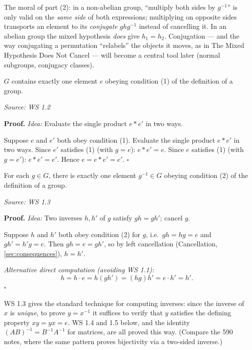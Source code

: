 \documentclass[11pt]{report}
\renewenvironment{proof}[1][Proof]{\noindent\textbf{#1.} }{\hfill$\square$\par\vspace{5pt}}
\newcommand{\srcline}[1]{\par\hfill{\footnotesize\textit{Source: #1}}}
\begin{document}
\begin{rembox}\label{rem:left-vs-right-conjugation}
The moral of part (2): in a non-abelian group, ``multiply both sides by $g^{-1}$'' is only valid on the \emph{same side} of both expressions; multiplying on opposite sides transports an element to its \emph{conjugate} $g h g^{-1}$ instead of cancelling it. In an abelian group the mixed hypothesis \emph{does} give $h_1 = h_2$. Conjugation --- and the way conjugating a permutation ``relabels'' the objects it moves, as in The Mixed Hypothesis Does Not Cancel --- will become a central tool later (normal subgroups, conjugacy classes).
\end{rembox}

\begin{propbox}\label{prop:uniqueness-identity}
$G$ contains exactly one element $e$ obeying condition (1) of the definition of a group.
\srcline{WS 1.2}
\end{propbox}

\begin{proof}
\textit{Idea:} Evaluate the single product $e \ast e'$ in two ways.\par
Suppose $e$ and $e'$ both obey condition (1). Evaluate the single product $e * e'$ in two ways. Since $e'$ satisfies (1) (with $g = e$): $e * e' = e$. Since $e$ satisfies (1) (with $g = e'$): $e * e' = e'$. Hence $e = e * e' = e'$.
\end{proof}

\begin{propbox}\label{prop:uniqueness-inverses}
For each $g \in G$, there is exactly one element $g^{-1} \in G$ obeying condition (2) of the definition of a group.
\srcline{WS 1.3}
\end{propbox}

\begin{proof}
\textit{Idea:} Two inverses $h, h'$ of $g$ satisfy $gh = gh'$; cancel $g$.\par
Suppose $h$ and $h'$ both obey condition (2) for $g$, i.e.\ $g h = h g = e$ and $g h' = h' g = e$. Then $g h = e = g h'$, so by left cancellation (Cancellation, \ref{sec:consequences}), $h = h'$.

\textit{Alternative direct computation (avoiding WS 1.1):}
\[ h = h \cdot e = h (g h') = (h g) h' = e \cdot h' = h'. \]
\end{proof}

\begin{rembox}\label{rem:uniqueness-technique}
WS 1.3 gives the standard technique for computing inverses: since the inverse of $x$ is \emph{unique}, to prove $y = x^{-1}$ it suffices to verify that $y$ satisfies the defining property $x y = y x = e$. WS 1.4 and 1.5 below, and the identity $(AB)^{-1} = B^{-1} A^{-1}$ for matrices, are all proved this way. (Compare the 590 notes, where the same pattern proves bijectivity via a two-sided inverse.)
\end{rembox}
\end{document}
